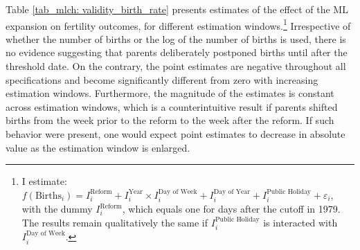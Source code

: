 Table \ref{tab_mlch: validity_birth_rate} presents estimates of the effect of the ML expansion on fertility outcomes, for different estimation windows.\footnote{I estimate: $f(\text{Births}_i) = I^{\text{Reform}}_i + I^{\text{Year}}_i\times I^{\text{Day of Week}}_i + I^{\text{Day of Year}}_i + I^{\text{Public Holiday}}_i + \varepsilon_i$, with the dummy $I^{\text{Reform}}_i$, which equals one for days after the cutoff in 1979. The results remain qualitatively the same if $I^{\text{Public Holiday}}_i$ is interacted with $I^{\text{Day of Week}}_i$.} Irrespective of whether the number of births or the log of the number of births is used, there is no evidence suggesting that parents deliberately postponed births until after the threshold date. On the contrary, the point estimates are negative throughout all specifications and become significantly different from zero with increasing estimation windows. Furthermore, the magnitude of the estimates is constant across estimation windows, which is a counterintuitive result if parents shifted births from the week prior to the reform to the week after the reform. If such behavior were present, one would expect point estimates to decrease in absolute value as the estimation window is enlarged. 





\label{rev_mlch:threats_birth_months}

